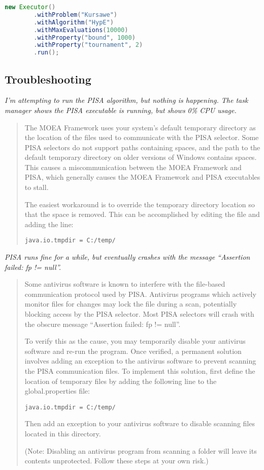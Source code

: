 \begin{lstlisting}[language=Java]
new Executor()
		.withProblem("Kursawe")
		.withAlgorithm("HypE")
		.withMaxEvaluations(10000)
		.withProperty("bound", 1000)
		.withProperty("tournament", 2)
		.run();
\end{lstlisting}

\subsection{Troubleshooting}

\noindent
\textit{I'm attempting to run the PISA algorithm, but nothing is happening.  The task manager shows the PISA executable is running, but shows 0\% CPU usage.}

\begin{quote}
The MOEA Framework uses your system's default temporary directory as the location of the files used to communicate with the PISA selector.  Some PISA selectors do not support paths containing spaces, and the path to the default temporary directory on older versions of Windows contains spaces.  This causes a miscommunication between the MOEA Framework and PISA, which generally causes the MOEA Framework and PISA executables to stall.

The easiest workaround is to override the temporary directory location so that the space is removed.  This can be accomplished by editing the  file and adding the line:

\begin{lstlisting}[language=Plaintext]
java.io.tmpdir = C:/temp/
\end{lstlisting}
\end{quote}

\noindent
\textit{PISA runs fine for a while, but eventually crashes with the message ``Assertion failed: fp != null''.}

\begin{quote}
Some antivirus software is known to interfere with the file-based communication protocol used by PISA.  Antivirus programs which actively monitor files for changes may lock the file during a scan, potentially blocking access by the PISA selector.  Most PISA selectors will crash with the obscure message ``Assertion failed: fp != null''.

To verify this as the cause, you may temporarily disable your antivirus software and re-run the program.  Once verified, a permanent solution involves adding an exception to the antivirus software to prevent scanning the PISA communication files.  To implement this solution, first define the location of temporary files by adding the following line to the global.properties file:

\begin{lstlisting}[language=Plaintext]
java.io.tmpdir = C:/temp/
\end{lstlisting}

Then add an exception to your antivirus software to disable scanning files located in this directory.

(Note: Disabling an antivirus program from scanning a folder will leave its contents unprotected.  Follow these steps at your own risk.)
\end{quote}

